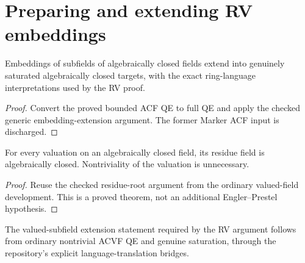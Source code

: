 \section{Preparing and extending RV embeddings}

\begin{theorem}

\label{acf-extension}


\leanok

Embeddings of subfields of algebraically closed fields extend into genuinely
saturated algebraically closed targets, with the exact ring-language
interpretations used by the RV proof.

\end{theorem}

\begin{proof}


\leanok

Convert the proved bounded ACF QE to full QE and apply the checked generic
embedding-extension argument. The former Marker ACF input is discharged.

\end{proof}

\begin{theorem}

\label{residue-closure}


\leanok

For every valuation on an algebraically closed field, its residue field is
algebraically closed. Nontriviality of the valuation is unnecessary.

\end{theorem}

\begin{proof}

\leanok

Reuse the checked residue-root argument from the ordinary valued-field
development. This is a proved theorem, not an additional Engler--Prestel hypothesis.

\end{proof}

\begin{theorem}

\label{valued-extension}


\leanok

The valued-subfield extension statement required by the RV argument follows
from ordinary nontrivial ACVF QE and genuine saturation, through the
repository's explicit language-translation bridges.

\end{theorem}

